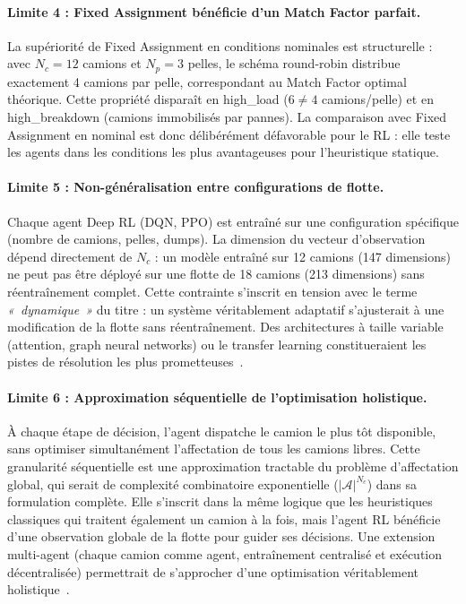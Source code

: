 \documentclass[11pt,a4paper]{report}
\begin{document}
\paragraph{Limite 4 : Fixed Assignment bénéficie d'un Match Factor parfait.}
La supériorité de Fixed Assignment en conditions nominales est structurelle : avec $N_c = 12$ camions et $N_p = 3$ pelles, le schéma round-robin distribue exactement 4 camions par pelle, correspondant au Match Factor optimal théorique. Cette propriété disparaît en high\_load ($6 \neq 4$ camions/pelle) et en high\_breakdown (camions immobilisés par pannes). La comparaison avec Fixed Assignment en nominal est donc délibérément défavorable pour le RL : elle teste les agents dans les conditions les plus avantageuses pour l'heuristique statique.

\paragraph{Limite 5 : Non-généralisation entre configurations de flotte.}
Chaque agent Deep RL (DQN, PPO) est entraîné sur une configuration spécifique (nombre de camions, pelles, dumps). La dimension du vecteur d'observation dépend directement de $N_c$ : un modèle entraîné sur 12 camions (147 dimensions) ne peut pas être déployé sur une flotte de 18 camions (213 dimensions) sans réentraînement complet. Cette contrainte s'inscrit en tension avec le terme \emph{«~dynamique~»} du titre : un système véritablement adaptatif s'ajusterait à une modification de la flotte sans réentraînement. Des architectures à taille variable (attention, graph neural networks) ou le transfer learning constitueraient les pistes de résolution les plus prometteuses~\cite{WZeng2022}.

\paragraph{Limite 6 : Approximation séquentielle de l'optimisation holistique.}
À chaque étape de décision, l'agent dispatche le camion le plus tôt disponible, sans optimiser simultanément l'affectation de tous les camions libres. Cette granularité séquentielle est une approximation tractable du problème d'affectation global, qui serait de complexité combinatoire exponentielle ($|\mathcal{A}|^{N_c}$) dans sa formulation complète. Elle s'inscrit dans la même logique que les heuristiques classiques qui traitent également un camion à la fois, mais l'agent RL bénéficie d'une observation globale de la flotte pour guider ses décisions. Une extension multi-agent (chaque camion comme agent, entraînement centralisé et exécution décentralisée) permettrait de s'approcher d'une optimisation véritablement holistique~\cite{Zhao2025HierarchicalMARL}.
\end{document}
